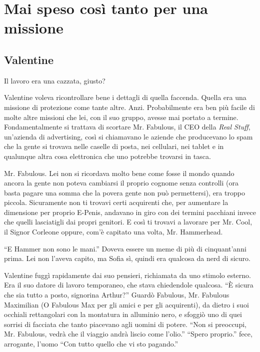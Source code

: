 \chapter{Mai speso così tanto per una missione}

  \section*{Valentine}
    
    Il lavoro era una cazzata, giusto?

    Valentine voleva ricontrollare bene i dettagli di quella faccenda.
    Quella era una missione di protezione come tante altre. Anzi.
    Probabilmente era ben più facile di molte altre missioni che lei, con
    il suo gruppo, avesse mai portato a termine. Fondamentalmente si
    trattava di scortare Mr. Fabulous, il CEO della \emph{Real Stuff},
    un'azienda di advertising,
    così si chiamavano le aziende che producevano lo spam che la gente si
    trovava nelle caselle di posta, nei cellulari, nei tablet e in
    qualunque altra cosa elettronica che uno potrebbe trovarsi in tasca.

    Mr. Fabulous. Lei non si ricordava molto bene come fosse il mondo
    quando ancora la gente non poteva cambiarsi il proprio cognome senza
    controlli (ora basta pagare una somma che la povera gente non può
    permettersi), era
    troppo piccola. Sicuramente non ti trovavi certi acquirenti che, per
    aumentare la dimensione per proprio E-Penis, andavano in giro con dei
    termini pacchiani invece che quelli lasciatigli dai propri genitori.
    E così ti trovavi a lavorare per Mr. Cool, il Signor Corleone oppure,
    com'è capitato una volta, Mr. Hammerhead.

    ``E Hammer non sono le mani.'' Doveva essere un meme di più di
    cinquant'anni prima. Lei non l'aveva capito, ma Sofia sì, quindi era
    qualcosa da nerd di sicuro.

    Valentine fuggì rapidamente dai suo pensieri, richiamata da uno stimolo
    esterno. Era il suo datore di lavoro temporaneo, che stava chiedendole
    qualcosa. ``È sicura che sia tutto a posto, signorina Arthur?''
    Guardò Fabulous, Mr. Fabulous Maximilian (O Fabulous Max per gli amici
    e per gli acquirenti), da dietro i suoi occhiali rettangolari con la
    montatura in alluminio nero, e sfoggiò uno di quei sorrisi di facciata
    che tanto piacevano agli uomini di potere. ``Non si preoccupi, Mr.
    Fabulous, vedrà che il viaggio andrà liscio come l'olio.'' ``Spero
    proprio.'' fece, arrogante, l'uomo ``Con tutto quello che vi sto
    pagando.''

